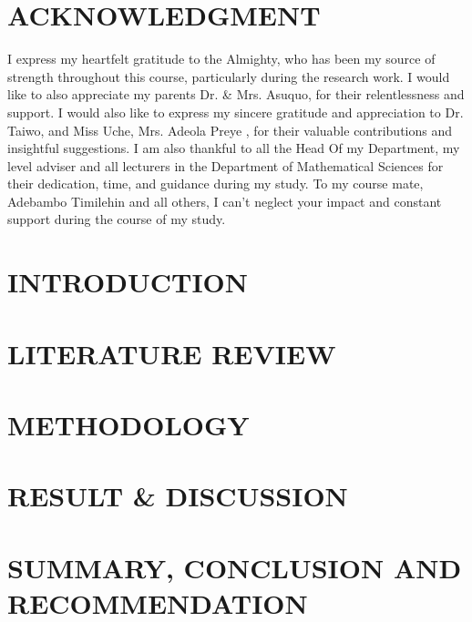 \documentclass[12pt, twoside]{report}
\begin{document}
	\chapter*{ACKNOWLEDGMENT}
	I express my heartfelt gratitude to the Almighty, who has been my source of strength throughout this course, particularly during the research work.
	I would like to also appreciate my parents Dr. \& Mrs. Asuquo, for their relentlessness and support.  
	I would also like to express my sincere gratitude and appreciation to Dr. Taiwo, and Miss Uche, Mrs. Adeola Preye , for their valuable contributions and insightful suggestions.
	I am also thankful to all the Head Of my Department, my level adviser and all lecturers in the Department of Mathematical Sciences for their dedication, time, and guidance during my study.
	To my course mate, Adebambo Timilehin and all others, I can’t neglect your impact and constant support during the course of my study.
	
	\tableofcontents
	\listoffigures
	\listoftables
	
	\clearpage
	
	
	
	\begin{spacing}{1.5}
		\chapter{INTRODUCTION}
		
		
		\chapter{LITERATURE REVIEW}
		
		
		\chapter{METHODOLOGY}
		
		
		\chapter{RESULT \& DISCUSSION}
		
		
		\chapter{SUMMARY, CONCLUSION AND RECOMMENDATION}
		
		
		
	\end{spacing}
	
\end{document}
